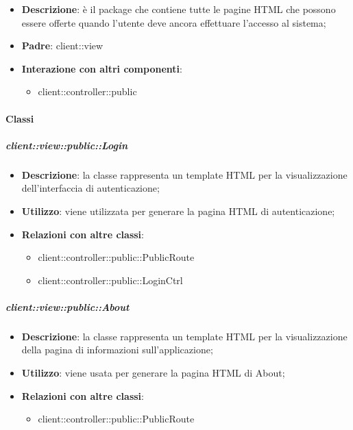 \begin{itemize}
	\item \textbf{Descrizione}: è il package che contiene tutte le pagine HTML che possono essere offerte quando l'utente deve ancora effettuare l'accesso al sistema;
	\item \textbf{Padre}: client::view
	\item \textbf{Interazione con altri componenti}:
		\begin{itemize}
			\item client::controller::public
		\end{itemize}
\end{itemize}

	\paragraph{Classi} %
		\subparagraph{client::view::public::Login} %
		\label{subp:bdsm_app_client_view_public_login}
			\begin{itemize}
				\item \textbf{Descrizione}: la classe rappresenta un template HTML per la visualizzazione dell'interfaccia di autenticazione;
				\item \textbf{Utilizzo}: viene utilizzata per generare la pagina HTML di autenticazione;
				\item \textbf{Relazioni con altre classi}:
					\begin{itemize}
						\item client::controller::public::PublicRoute
						\item client::controller::public::LoginCtrl
					\end{itemize}
			\end{itemize}

		\subparagraph{client::view::public::About} %
		\label{subp:bdsm_app_client_view_public_about}
			\begin{itemize}
				\item \textbf{Descrizione}: la classe rappresenta un template HTML per la visualizzazione della pagina di informazioni sull'applicazione;
				\item \textbf{Utilizzo}: viene usata per generare la pagina HTML di About;
				\item \textbf{Relazioni con altre classi}:
					\begin{itemize}
						\item client::controller::public::PublicRoute
					\end{itemize}
			\end{itemize}


